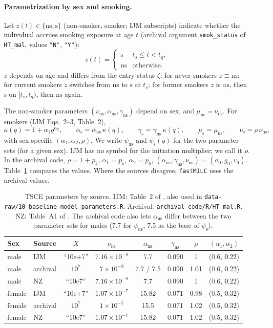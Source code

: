 \documentclass[11pt]{article}
\newcommand{\code}[1]{\texttt{#1}}
\newcommand{\ns}{\mathrm{ns}}
\newcommand{\sm}{\mathrm{s}}
\begin{document}
\paragraph{Parametrization by sex and smoking.} Let $z(t)\in\{\ns,\sm\}$
(non-smoker, smoker; IJM subscripts) indicate whether the individual accrues
smoking exposure at age $t$ (archival argument \code{smok\_status} of
\code{HT\_mal}, values \code{"N"}, \code{"Y"}):
\[
z(t) = \begin{cases} \sm & t_s \le t < t_q,\\ \ns & \text{otherwise.}\end{cases}
\]
$z$ depends on age and differs from the entry status $\zeta$: for never smokers
$z\equiv \ns$; for current smokers $z$ switches from $\ns$ to $\sm$ at $t_s$; for
former smokers $z$ is $\ns$, then $\sm$ on $[t_s,t_q)$, then $\ns$ again.

The non-smoker parameters $(\nu_\ns,\alpha_\ns,\gamma_\ns)$ depend on sex, and
$\mu_\ns=\nu_\ns$. For smokers (IJM Eqs.~2--3, Table~2),
\[
\kappa(q) = 1 + \alpha_1 q^{\alpha_2},\qquad
\alpha_\sm = \alpha_\ns\,\kappa(q),\qquad
\gamma_\sm = \gamma_\ns\,\kappa(q),\qquad
\mu_\sm = \mu_\ns,\qquad
\nu_\sm = \rho\,\nu_\ns,
\]
with sex-specific $(\alpha_1,\alpha_2,\rho)$. We write $\psi_\ns$ and
$\psi_\sm(q)$ for the two parameter sets (for a given sex). IJM has no symbol for
the initiation multiplier; we call it $\rho$. In the archival code, $\rho=1+p_4$,
$\alpha_1 = p_5$, $\alpha_2=p_6$, $(\alpha_\ns,\gamma_\ns,\nu_\ns) = (a_0,g_0,v_0)$.
Table~\ref{tab:tsce} compares the values. Where the sources disagree,
\code{fastMILC} uses the archival values.

\begin{table}[h]
\centering
\caption{TSCE parameters by source. IJM: Table~2 of \cite{ijm2017}, also used in
\code{data-raw/10\_baseline\_model\_parameters.R}. Archival:
\code{archival\_code/R/HT\_mal.R}. NZ: Table~A1 of \cite{nz2024}. The archival code
also lets $\alpha_\ns$ differ between the two parameter sets for males (7.7 for
$\psi_\ns$, 7.5 as the base of $\psi_\sm$).}\label{tab:tsce}
\begin{tabular}{@{}l l cccccc@{}}
\toprule
Sex & Source & $X$ & $\nu_\ns$ & $\alpha_\ns$ & $\gamma_\ns$ & $\rho$ & $(\alpha_1,\alpha_2)$ \\
\midrule
male   & IJM      & ``10e+7'' & $7.16\times10^{-8}$ & 7.7  & 0.090 & 1    & (0.6, 0.22) \\
male   & archival & $10^7$    & $7\times10^{-8}$    & 7.7 / 7.5 & 0.090 & 1.01 & (0.6, 0.22) \\
male   & NZ       & ``10e7'' & $7.16\times10^{-8}$ & 7.7  & 0.090 & 1    & (0.6, 0.22) \\
\midrule
female & IJM      & ``10e+7'' & $1.07\times10^{-7}$ & 15.82 & 0.071 & 0.98 & (0.5, 0.32) \\
female & archival & $10^7$    & $1\times10^{-7}$    & 15.5  & 0.071 & 1.02 & (0.5, 0.32) \\
female & NZ       & ``10e7'' & $1.07\times10^{-7}$ & 15.82 & 0.071 & 1.02 & (0.5, 0.32) \\
\bottomrule
\end{tabular}
\end{table}
\end{document}
